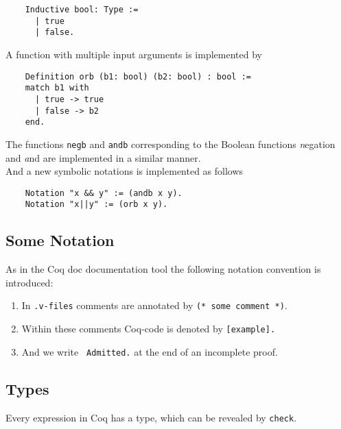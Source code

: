     \label{Def:booleans}
    \begin{lstlisting}    
    Inductive bool: Type :=
      | true
      | false.
    \end{lstlisting}
     A function with multiple input arguments is implemented by
    \begin{lstlisting}
    Definition orb (b1: bool) (b2: bool) : bool :=
    match b1 with
	  | true -> true
	  | false -> b2
    end.
    \end{lstlisting}    
    The functions \lstinline!negb! and \lstinline!andb! corresponding to the Boolean functions {\emph negation} and {\emph and} are implemented in a similar manner.\\   
    And a new symbolic notations is implemented as follows
    \begin{lstlisting}
    Notation "x && y" := (andb x y).
    Notation "x||y" := (orb x y).
    \end{lstlisting}
    
     
\subsection{Some Notation}
    As in the Coq doc documentation tool the following notation convention is introduced:
     
    \begin{enumerate}
     \item In \texttt{.v-files} comments are annotated by \lstinline!(* some comment *)!. 
     \item Within these comments Coq-code is denoted by \lstinline![example].! 
     \item And we write \lstinline! Admitted.! at the end of an incomplete proof.    
     \end{enumerate}
     
     
\subsection{Types}
     Every expression in Coq has a type, which can be revealed by \lstinline!check!. 
   
